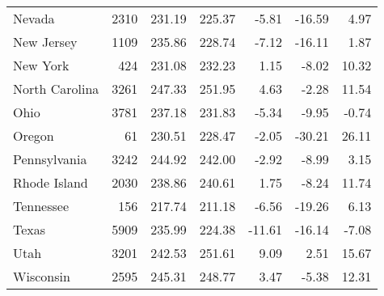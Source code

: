 \begin{table}[ht]
\begin{center}
\begin{tabular}{lrrrrrr}
  Nevada & 2310 & 231.19 & 225.37 & -5.81 & -16.59 & 4.97 \\ 
  New Jersey & 1109 & 235.86 & 228.74 & -7.12 & -16.11 & 1.87 \\ 
  New York & 424 & 231.08 & 232.23 & 1.15 & -8.02 & 10.32 \\ 
  North Carolina & 3261 & 247.33 & 251.95 & 4.63 & -2.28 & 11.54 \\ 
  Ohio & 3781 & 237.18 & 231.83 & -5.34 & -9.95 & -0.74 \\ 
  Oregon &  61 & 230.51 & 228.47 & -2.05 & -30.21 & 26.11 \\ 
  Pennsylvania & 3242 & 244.92 & 242.00 & -2.92 & -8.99 & 3.15 \\ 
  Rhode Island & 2030 & 238.86 & 240.61 & 1.75 & -8.24 & 11.74 \\ 
  Tennessee & 156 & 217.74 & 211.18 & -6.56 & -19.26 & 6.13 \\ 
  Texas & 5909 & 235.99 & 224.38 & -11.61 & -16.14 & -7.08 \\ 
  Utah & 3201 & 242.53 & 251.61 & 9.09 & 2.51 & 15.67 \\ 
  Wisconsin & 2595 & 245.31 & 248.77 & 3.47 & -5.38 & 12.31 \\ 
   \hline
\end{tabular}
\end{center}
\end{table}
